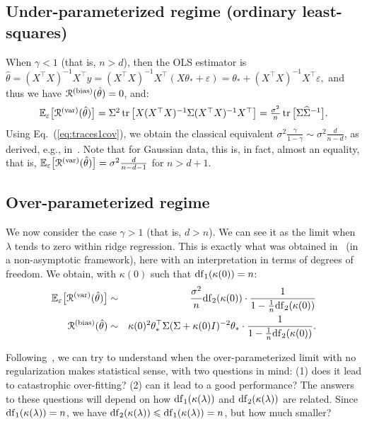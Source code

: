 \documentclass[11pt]{article}
\newcommand{\BEAS}{\begin{eqnarray*}}
\newcommand{\EEAS}{\end{eqnarray*}}
\newcommand{\tr}{\mathop{ \rm tr}}
\newcommand{\idm}{I}
\newcommand{\eq}[1]{Eq.~(\ref{eq:#1})}
\def \hS{ \widehat{ \Sigma} }
\def \S{  { \Sigma} }
\def \E{{\mathbb E}}
\begin{document}
\subsection{Under-parameterized regime (ordinary least-squares)}

 

\label{sec:ols}
When $\gamma < 1$ (that is, $n>d$), then the OLS estimator is 
$\hat{\theta} = (X^\top X)^{-1} X^\top y = (X^\top X)^{-1} X^\top (X \theta_\ast + \varepsilon)
= \theta_\ast + (X^\top X)^{-1} X^\top \varepsilon,$
and thus we have $\mathcal{R}^{({\rm bias})}(\hat{\theta})=0$, and:
$$\textstyle
\E_\varepsilon \big[ \mathcal{R}^{({\rm var})}(\hat{\theta})\big] = \S^2 \tr \big[ X  (X^\top X)^{-1}  \S  (X^\top X)^{-1} X^\top \big] = \frac{\sigma^2}{n} \tr \big[   \S  \hS^{-1} \big].
$$
Using \eq{traces1cov}, we  obtain the classical equivalent $  \sigma^2 \frac{ \gamma}{1-\gamma} \sim \sigma^2 \frac{ d}{n - d}$, as derived, e.g.,  in~\cite{hastie2019surprises}.
Note that for Gaussian data, this is, in fact, almost an equality, that is, 
$\E_\varepsilon \big[ \mathcal{R}^{({\rm var})}(\hat{\theta})\big] = \sigma^2 \frac{ d}{n - d - 1}$ for $n>d+1$.

\subsection{Over-parameterized regime}
\label{sec:ridge_overparam}

We now consider the case $\gamma>1$ (that is, $d>n$).
We can see it as the limit when $\lambda$ tends to zero within ridge regression. This is exactly what was obtained in~\cite{hastie2019surprises} (in a non-asymptotic framework), here with an interpretation in terms of degrees of freedom. We obtain, with $\kappa(0)$ such that $ {\rm df}_1(\kappa(0)) = n$:
\BEAS
 \E_\varepsilon \big[ \mathcal{R}^{({\rm var})}(\hat{\theta}) \big]
   & \sim & 
 \frac{\sigma^2}{n}  {\rm df}_2(\kappa(0))
 \cdot
  \frac{1}{1 - \frac{1}{n}  {\rm df}_2(\kappa(0))}
\\
 \mathcal{R}^{({\rm bias})}(\hat{\theta}) 
    & \sim & \kappa(0)^2 \theta_\ast ^\top \S ( \S + \kappa(0) \idm)^{-2} \theta_\ast 
 \cdot   \frac{1}{1 - \frac{1}{n}  {\rm df}_2(\kappa(0))}.
 \EEAS

Following~\cite{bartlett2020benign,hastie2019surprises}, we can try to understand when the over-parameterized limit with no regularization makes statistical sense, with two questions in mind: (1) does it lead to catastrophic over-fitting? (2) can it lead to a good performance? The answers to these questions will depend on how ${\rm df}_1(\kappa(\lambda)) $ and ${\rm df}_2(\kappa(\lambda)) $ are related. Since ${\rm df}_1(\kappa(\lambda)) =n$, we have ${\rm df}_2(\kappa(\lambda)) \leqslant {\rm df}_1(\kappa(\lambda)) = n$, but how much smaller?
\end{document}
